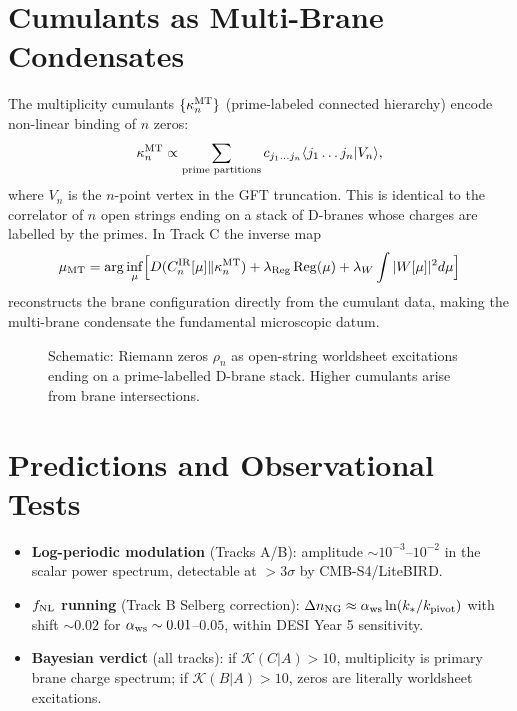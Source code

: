\documentclass[11pt,a4paper]{article}
\begin{document}
\section{Cumulants as Multi-Brane Condensates}
The multiplicity cumulants \(\{\kappa_n^{\rm MT}\}\) (prime-labeled connected hierarchy) encode non-linear binding of \(n\) zeros:
\[
\kappa_n^{\rm MT} \propto \sum_{\text{prime partitions}} c_{j_1\dots j_n} \langle j_1\dots j_n | V_n \rangle,
\]
where \(V_n\) is the \(n\)-point vertex in the GFT truncation. This is identical to the correlator of \(n\) open strings ending on a stack of D-branes whose charges are labelled by the primes. In Track C the inverse map
\[
\mu_{\rm MT} = \arg\inf_{\mu} \Bigl[ D(C_n^{\rm IR}[\mu]\Vert\kappa_n^{\rm MT}) + \lambda_{\rm Reg}\operatorname{Reg}(\mu) + \lambda_W\int|W[\mu]|^2 d\mu \Bigr]
\]
reconstructs the brane configuration directly from the cumulant data, making the multi-brane condensate the fundamental microscopic datum.

\begin{figure}[h]
\centering
{}
\caption{Schematic: Riemann zeros \(\rho_n\) as open-string worldsheet excitations ending on a prime-labelled D-brane stack. Higher cumulants arise from brane intersections.}
\end{figure}

\section{Predictions and Observational Tests}
\begin{itemize}
\item \textbf{Log-periodic modulation} (Tracks A/B): amplitude \(\sim 10^{-3}\)--\(10^{-2}\) in the scalar power spectrum, detectable at \(>3\sigma\) by CMB-S4/LiteBIRD.
\item \textbf{\(f_{\rm NL}\) running} (Track B Selberg correction): \(\Delta n_{\rm NG} \approx \alpha_{\rm ws} \ln(k_*/k_{\rm pivot})\) with shift \(\sim 0.02\) for \(\alpha_{\rm ws}\sim 0.01\)--\(0.05\), within DESI Year 5 sensitivity.
\item \textbf{Bayesian verdict} (all tracks): if \(\mathcal{K}(C|A)>10\), multiplicity is primary brane charge spectrum; if \(\mathcal{K}(B|A)>10\), zeros are literally worldsheet excitations.
\end{itemize}
\end{document}
